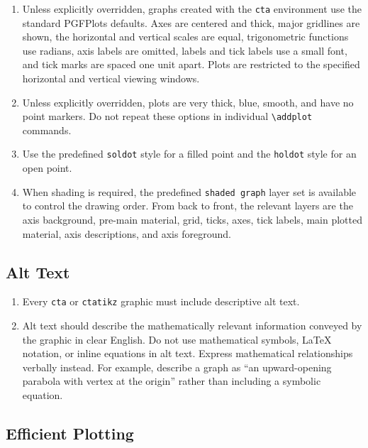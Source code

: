 \documentclass[document,notitlepage]{mhdocument}
\begin{document}
\begin{enumerate}[resume]
\item Unless explicitly overridden, graphs created with the \texttt{cta}
environment use the standard PGFPlots defaults. Axes are centered and thick,
major gridlines are shown, the horizontal and vertical scales are equal,
trigonometric functions use radians, axis labels are omitted, labels and tick
labels use a small font, and tick marks are spaced one unit apart. Plots are
restricted to the specified horizontal and vertical viewing windows.

\item Unless explicitly overridden, plots are very thick, blue, smooth, and
have no point markers. Do not repeat these options in individual
\verb|\addplot| commands.

\item Use the predefined \texttt{soldot} style for a filled point and the
\texttt{holdot} style for an open point.

\item When shading is required, the predefined \texttt{shaded graph} layer set
is available to control the drawing order. From back to front, the relevant
layers are the axis background, pre-main material, grid, ticks, axes, tick
labels, main plotted material, axis descriptions, and axis foreground.
\end{enumerate}

\subsection{Alt Text}

\begin{enumerate}[resume]
\item Every \texttt{cta} or \texttt{ctatikz} graphic must include descriptive
alt text.

\item Alt text should describe the mathematically relevant information conveyed
by the graphic in clear English. Do not use mathematical symbols, LaTeX
notation, or inline equations in alt text. Express mathematical relationships
verbally instead. For example, describe a graph as ``an upward-opening
parabola with vertex at the origin'' rather than including a symbolic equation.
\end{enumerate}

\subsection{Efficient Plotting}
\end{document}
